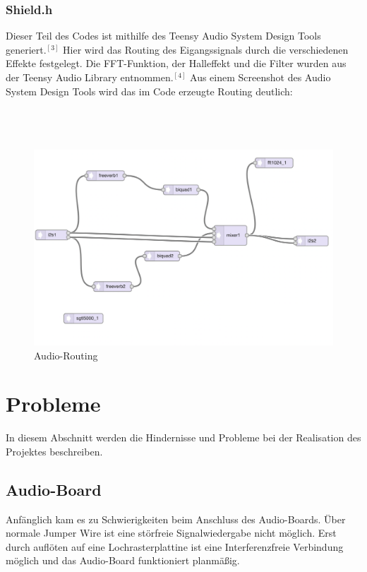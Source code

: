 \documentclass[12pt]{article}
\begin{document}
\subsubsection{Shield.h}
Dieser Teil des Codes ist mithilfe des Teensy Audio System Design Tools generiert.$^{[3]}$ Hier wird das Routing des Eigangssignals durch die verschiedenen Effekte festgelegt. 
Die FFT-Funktion, der Halleffekt und die Filter wurden aus der Teensy Audio Library entnommen.$^{[4]}$
Aus einem Screenshot des Audio System Design Tools wird das im Code erzeugte Routing deutlich:
\\
\\
\\
\\
\begin{figure}[h]
  \centering
  \caption{Audio-Routing}
  \includegraphics[width=\textwidth]{AudioDesignTool}
\end{figure}
\newpage
\section{Probleme}
In diesem Abschnitt werden die Hindernisse und Probleme bei der Realisation des Projektes beschreiben.
\subsection{Audio-Board}
Anfänglich kam es zu Schwierigkeiten beim Anschluss des Audio-Boards. Über normale Jumper Wire ist eine störfreie Signalwiedergabe nicht möglich. 
Erst durch auflöten auf eine Lochrasterplattine ist eine Interferenzfreie Verbindung möglich und das Audio-Board funktioniert planmäßig.
\end{document}
